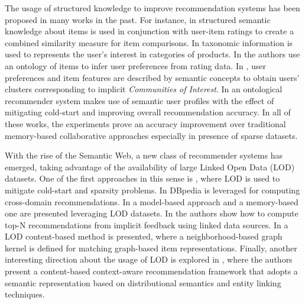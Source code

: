 The usage of structured knowledge to improve recommendation systems has been proposed in many works in the past. 
For instance, in \cite{mobasher2004} structured semantic knowledge about items is used in conjunction with user-item ratings to create a combined similarity measure for item comparisons. 
In \cite{Ziegler2004} taxonomic information is used to represents the user's interest in categories of products. %
In \cite{Anand2007} the authors use an ontology of items to infer user preferences from rating data. %
In \cite{Cantador08amultilayer}, user preferences and item features are described by semantic concepts to obtain users' clusters corresponding to implicit \textit{Communities of Interest}.
In \cite{Middleton_2009} an ontological recommender system makes use of semantic user profiles with the effect of mitigating cold-start and improving overall recommendation accuracy. 
In all of these works, the experiments prove an accuracy improvement over traditional memory-based collaborative approaches especially in presence of sparse datasets. 

With the rise of the Semantic Web, a new class of recommender systems has emerged, taking advantage of the availability of large Linked Open Data (LOD) datasets. 
One of the first approaches in this sense is \cite{HeitmannH10}, where LOD is used to mitigate cold-start and sparsity problems. 
In \cite{Fernandez-Tobias2011} DBpedia is leveraged for computing cross-domain recommendations. 
In \cite{DMOR12,DMORZ12} a model-based approach and a memory-based one are presented leveraging LOD datasets. 
In \cite{Ostuni2013} the authors show how to compute top-N recommendations from implicit feedback using linked data sources. 
In \cite{ODMD14a} a LOD content-based method is presented, where a neighborhood-based graph kernel is defined for matching graph-based item representations. 
Finally, another interesting direction about the usage of LOD is explored in \cite{MustoSLG14}, where the authors present a content-based context-aware recommendation framework that adopts a semantic representation based on distributional semantics and entity linking techniques.%

